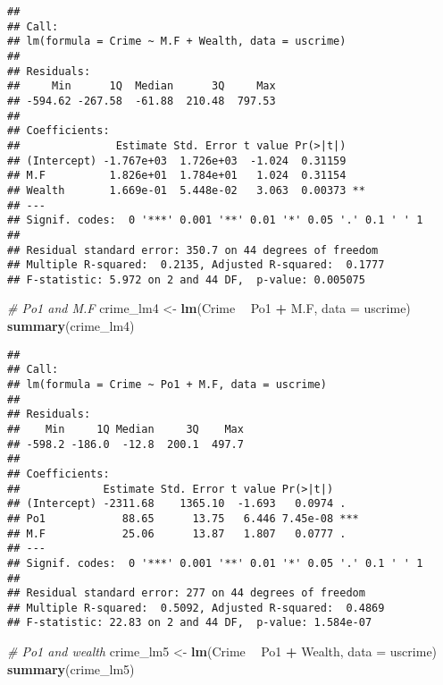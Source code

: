 \documentclass[]{article}
\newenvironment{Shaded}{\begin{snugshade}}{\end{snugshade}}
\newcommand{\KeywordTok}[1]{\textcolor[rgb]{0.13,0.29,0.53}{\textbf{#1}}}
\newcommand{\DataTypeTok}[1]{\textcolor[rgb]{0.13,0.29,0.53}{#1}}
\newcommand{\StringTok}[1]{\textcolor[rgb]{0.31,0.60,0.02}{#1}}
\newcommand{\CommentTok}[1]{\textcolor[rgb]{0.56,0.35,0.01}{\textit{#1}}}
\newcommand{\OperatorTok}[1]{\textcolor[rgb]{0.81,0.36,0.00}{\textbf{#1}}}
\newcommand{\NormalTok}[1]{#1}
\begin{document}
\begin{verbatim}
## 
## Call:
## lm(formula = Crime ~ M.F + Wealth, data = uscrime)
## 
## Residuals:
##     Min      1Q  Median      3Q     Max 
## -594.62 -267.58  -61.88  210.48  797.53 
## 
## Coefficients:
##               Estimate Std. Error t value Pr(>|t|)   
## (Intercept) -1.767e+03  1.726e+03  -1.024  0.31159   
## M.F          1.826e+01  1.784e+01   1.024  0.31154   
## Wealth       1.669e-01  5.448e-02   3.063  0.00373 **
## ---
## Signif. codes:  0 '***' 0.001 '**' 0.01 '*' 0.05 '.' 0.1 ' ' 1
## 
## Residual standard error: 350.7 on 44 degrees of freedom
## Multiple R-squared:  0.2135, Adjusted R-squared:  0.1777 
## F-statistic: 5.972 on 2 and 44 DF,  p-value: 0.005075
\end{verbatim}

\begin{Shaded}
\begin{Highlighting}[]
\CommentTok{# Po1 and M.F}
\NormalTok{crime_lm4 <-}\StringTok{ }\KeywordTok{lm}\NormalTok{(Crime }\OperatorTok{~}\StringTok{ }\NormalTok{Po1 }\OperatorTok{+}\StringTok{ }\NormalTok{M.F, }\DataTypeTok{data =}\NormalTok{ uscrime)}
\KeywordTok{summary}\NormalTok{(crime_lm4)}
\end{Highlighting}
\end{Shaded}

\begin{verbatim}
## 
## Call:
## lm(formula = Crime ~ Po1 + M.F, data = uscrime)
## 
## Residuals:
##    Min     1Q Median     3Q    Max 
## -598.2 -186.0  -12.8  200.1  497.7 
## 
## Coefficients:
##             Estimate Std. Error t value Pr(>|t|)    
## (Intercept) -2311.68    1365.10  -1.693   0.0974 .  
## Po1            88.65      13.75   6.446 7.45e-08 ***
## M.F            25.06      13.87   1.807   0.0777 .  
## ---
## Signif. codes:  0 '***' 0.001 '**' 0.01 '*' 0.05 '.' 0.1 ' ' 1
## 
## Residual standard error: 277 on 44 degrees of freedom
## Multiple R-squared:  0.5092, Adjusted R-squared:  0.4869 
## F-statistic: 22.83 on 2 and 44 DF,  p-value: 1.584e-07
\end{verbatim}

\begin{Shaded}
\begin{Highlighting}[]
\CommentTok{# Po1 and wealth}
\NormalTok{crime_lm5 <-}\StringTok{ }\KeywordTok{lm}\NormalTok{(Crime }\OperatorTok{~}\StringTok{ }\NormalTok{Po1 }\OperatorTok{+}\StringTok{ }\NormalTok{Wealth, }\DataTypeTok{data =}\NormalTok{ uscrime)}
\KeywordTok{summary}\NormalTok{(crime_lm5)}
\end{Highlighting}
\end{Shaded}
\end{document}
